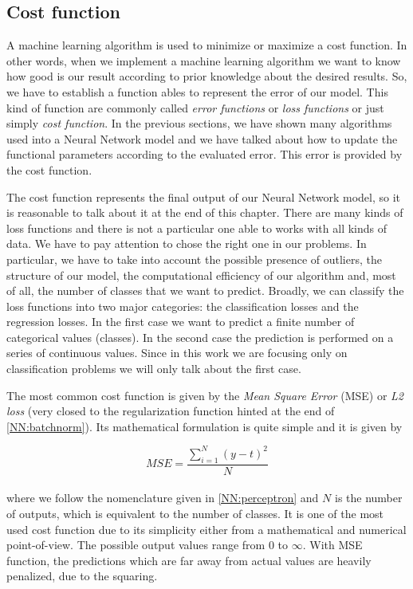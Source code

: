 \documentclass{standalone}
\begin{document}
\subsection[Cost function]{Cost function}\label{NN:cost}

A machine learning algorithm is used to minimize or maximize a cost function.
In other words, when we implement a machine learning algorithm we want to know how good is our result according to prior knowledge about the desired results.
So, we have to establish a function ables to represent the error of our model.
This kind of function are commonly called \emph{error functions} or \emph{loss functions} or just simply \emph{cost function}.
In the previous sections, we have shown many algorithms used into a Neural Network model and we have talked about how to update the functional parameters according to the evaluated error.
This error is provided by the cost function.

The cost function represents the final output of our Neural Network model, so it is reasonable to talk about it at the end of this chapter.
There are many kinds of loss functions and there is not a particular one able to works with all kinds of data.
We have to pay attention to chose the right one in our problems.
In particular, we have to take into account the possible presence of outliers, the structure of our model, the computational efficiency of our algorithm and, most of all, the number of classes that we want to predict.
Broadly, we can classify the loss functions into two major categories: the classification losses and the regression losses.
In the first case we want to predict a finite number of categorical values (classes).
In the second case the prediction is performed on a series of continuous values.
Since in this work we are focusing only on classification problems we will only talk about the first case.

The most common cost function is given by the \emph{Mean Square Error} (MSE) or \emph{L2 loss} (very closed to the regularization function hinted at the end of \ref{NN:batchnorm}).
Its mathematical formulation is quite simple and it is given by

$$
MSE = \frac{\sum_{i=1}^{N}\left( y - t \right)^2}{N}
$$
\\
where we follow the nomenclature given in \ref{NN:perceptron} and $N$ is the number of outputs, which is equivalent to the number of classes.
It is one of the most used cost function due to its simplicity either from a mathematical and numerical point-of-view.
The possible output values range from 0 to $\infty$.
With MSE function, the predictions which are far away from actual values are heavily penalized, due to the squaring.
\end{document}
